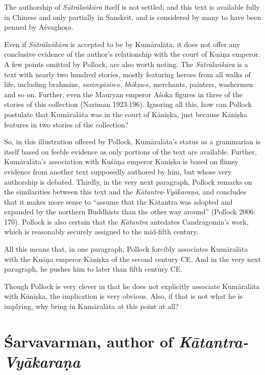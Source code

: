 The authorship of {\sl Sūtrālaṅkāra} itself is not settled; and this text is available fully in Chinese and only partially in Sanskrit, and is considered by many to have been penned by Aśvaghoṣa.

Even if {\sl Sūtrālaṅkāra} is accepted to be by Kumāralāta, it does not offer any conclusive evidence of the author's relationship with the court of Kuāṇa emperor. A few points omitted by Pollock, are also worth noting. The {\sl Sūtrālaṅkāra} is a text with nearly two hundred stories, mostly featuring heroes from all walks of life, including brahmins, {\sl saṁnyāsin}-s, {\sl bhikṣu}-s, merchants, painters, washermen and so on. Further, even the Mauryan emperor Aśoka figures in three of the stories of this collection (Nariman 1923:196). Ignoring all this, how can Pollock postulate that Kumāralāta was in the court of Kāniṣka, just because Kāniṣka features in two stories of the collection?

So, in this illustration offered by Pollock, Kumāralāta's status as a grammarian is itself based on feeble evidence as only portions of the text are available. Further, Kumāralāta's association with Kuśāṇa emperor Kaniṣka is based on flimsy evidence from another text supposedly authored by him, but whose very authorship is debated. Thirdly, in the very next paragraph, Pollock remarks on the similarities between this text and the {\sl Kātantra-Vyākaraṇa}, and concludes that it makes more sense to ``assume that the Kātantra was adopted and expanded by the northern Buddhists than the other way around'' (Pollock 2006: 170). Pollock is also certain that the {\sl Kātantra} antedates Candragomin's work, which is reasonably securely assigned to the mid-fifth century. 

All this means that, in one paragraph, Pollock forcibly associates Kumāralāta with the Kuāṇa emperor Kāniṣka of the second century CE. And in the very next paragraph, he pushes him to later than fifth century CE. 

Though Pollock is very clever in that he does not explicitly associate Kumāralāta with Kāniṣka, the implication is very obvious. Also, if that is not what he is implying, why bring in Kumāralāta at this point at all?

\section{Śarvavarman, author of {\sl\bfseries Kātantra-Vyākaraṇa}}\label{chap3-sec11}


